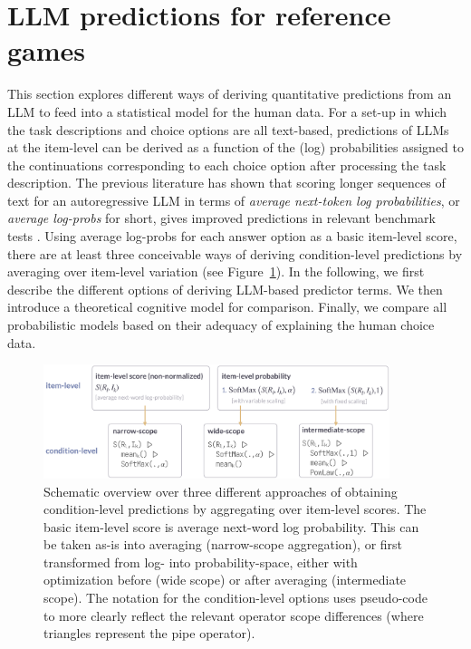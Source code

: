 \documentclass{article}
\begin{document}
\section{LLM predictions for reference games}
\label{llm-predictions-for-reference-games}

This section explores different ways of deriving quantitative predictions from an LLM to feed into a statistical model for the human data.
For a set-up in which the task descriptions and choice options are all text-based, predictions of LLMs at the item-level can be derived as a function of the (log) probabilities assigned to the continuations corresponding to each choice option after processing the task description.
The previous literature has shown that scoring longer sequences of text for an autoregressive LLM in terms of \emph{average next-token log probabilities}, or \emph{average log-probs} for short, gives improved predictions in relevant benchmark tests \citep[e.g.,][]{BrownMann2020:Language-Models}.
Using average log-probs for each answer option as a basic item-level score, there are at least three conceivable ways of deriving condition-level predictions by averaging over item-level variation (see Figure~\ref{fig:measures-overview}).
In the following, we first describe the different options of deriving LLM-based predictor terms.
We then introduce a theoretical cognitive model for comparison.
Finally, we compare all probabilistic models based on their adequacy of explaining the human choice data.

\begin{figure}
  \centering
  \includegraphics[width=0.9\textwidth]{00-pics/measures-overview.png}
  \caption{Schematic overview over three different approaches of obtaining condition-level predictions by aggregating over item-level scores. The basic item-level score is average next-word log probability. This can be taken as-is into averaging (narrow-scope aggregation), or first transformed from log- into probability-space, either with optimization before (wide scope) or after averaging (intermediate scope).
  The notation for the condition-level options uses pseudo-code to more clearly reflect the relevant operator scope differences (where triangles represent the pipe operator). }
  \label{fig:measures-overview}
\end{figure}
\end{document}
